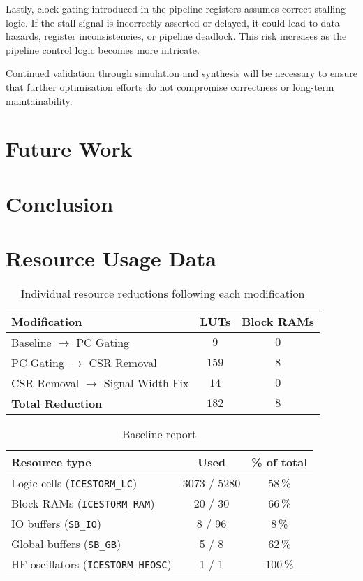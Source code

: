\documentclass[a4paper,10pt]{article}
\begin{document}
Lastly, clock gating introduced in the pipeline registers assumes 
correct stalling logic. If the stall signal is incorrectly asserted or delayed, 
it could lead to data hazards, register inconsistencies, or pipeline deadlock. 
This risk increases as the pipeline control logic becomes more intricate.

Continued validation through simulation and synthesis will be necessary 
to ensure that further optimisation efforts do not compromise correctness 
or long-term maintainability.

\section{Future Work}
\label{sec:Future_Work}

\section{Conclusion}
\label{sec:Conclusion}

\newpage
\appendix
\section{Resource Usage Data}

\begin{table}[H] 
    \centering
    \begin{tabularx}{0.6\textwidth}{X c c}
        \toprule
        Modification & LUTs & Block RAMs \\ \midrule
        Baseline $\rightarrow$ PC Gating & $9$ & $0$ \\
        PC Gating $\rightarrow$ CSR Removal & $159$ & $8$ \\
        CSR Removal $\rightarrow$ Signal Width Fix & $14$ & $0$ \\ \midrule
        \textbf{Total Reduction} & \textbf{$182$} & \textbf{$8$} \\
        \bottomrule
    \end{tabularx}
    \caption{Individual resource reductions following each modification}
    \label{tab:modification_reductions}
\end{table}


\begin{table}[H] 
    \centering
    \begin{tabularx}{0.6\textwidth}{X c c}
        \toprule
        Resource type & Used & \% of total \\ \midrule
        Logic cells (\texttt{ICESTORM\_LC}) & 3073 / 5280 & 58\,\% \\
        Block RAMs (\texttt{ICESTORM\_RAM}) & 20 / 30 & 66\,\% \\
        IO buffers (\texttt{SB\_IO}) & 8 / 96 & 8\,\% \\
        Global buffers (\texttt{SB\_GB}) & 5 / 8 & 62\,\% \\
        HF oscillators (\texttt{ICESTORM\_HFOSC}) & 1 / 1 & 100\,\% \\
        \bottomrule
    \end{tabularx}
    \caption{Baseline report}
    \label{tab:baseline}
\end{table}
\end{document}
